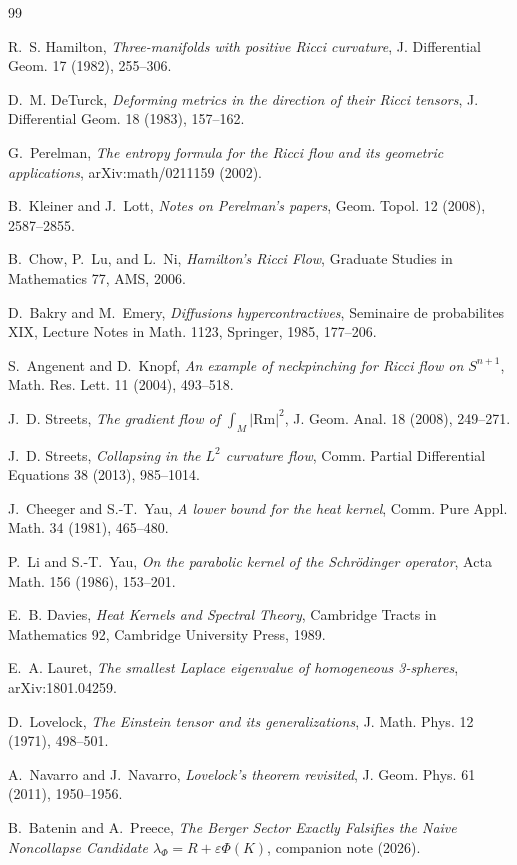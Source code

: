\documentclass[11pt]{amsart}
\newcommand{\Rm}{\mathrm{Rm}}
\begin{document}
\begin{thebibliography}{99}

R.~S. Hamilton,
\emph{Three-manifolds with positive Ricci curvature},
J. Differential Geom. 17 (1982), 255--306.

D.~M. DeTurck,
\emph{Deforming metrics in the direction of their Ricci tensors},
J. Differential Geom. 18 (1983), 157--162.

G.~Perelman,
\emph{The entropy formula for the Ricci flow and its geometric applications},
arXiv:math/0211159 (2002).

B.~Kleiner and J.~Lott,
\emph{Notes on Perelman's papers},
Geom. Topol. 12 (2008), 2587--2855.

B.~Chow, P.~Lu, and L.~Ni,
\emph{Hamilton's Ricci Flow},
Graduate Studies in Mathematics 77, AMS, 2006.

D.~Bakry and M.~Emery,
\emph{Diffusions hypercontractives},
Seminaire de probabilites XIX, Lecture Notes in Math. 1123, Springer, 1985, 177--206.

S.~Angenent and D.~Knopf,
\emph{An example of neckpinching for Ricci flow on \(S^{n+1}\)},
Math. Res. Lett. 11 (2004), 493--518.

J.~D. Streets,
\emph{The gradient flow of \(\int_M |\Rm|^2\)},
J. Geom. Anal. 18 (2008), 249--271.

J.~D. Streets,
\emph{Collapsing in the \(L^2\) curvature flow},
Comm. Partial Differential Equations 38 (2013), 985--1014.

J.~Cheeger and S.-T.~Yau,
\emph{A lower bound for the heat kernel},
Comm. Pure Appl. Math. 34 (1981), 465--480.

P.~Li and S.-T.~Yau,
\emph{On the parabolic kernel of the Schrödinger operator},
Acta Math. 156 (1986), 153--201.

E.~B. Davies,
\emph{Heat Kernels and Spectral Theory},
Cambridge Tracts in Mathematics 92, Cambridge University Press, 1989.

E.~A. Lauret,
\emph{The smallest Laplace eigenvalue of homogeneous 3-spheres},
arXiv:1801.04259.


D.~Lovelock,
\emph{The Einstein tensor and its generalizations},
J. Math. Phys. 12 (1971), 498--501.

A.~Navarro and J.~Navarro,
\emph{Lovelock's theorem revisited},
J. Geom. Phys. 61 (2011), 1950--1956.


B.~Batenin and A.~Preece,
\emph{The Berger Sector Exactly Falsifies the Naive Noncollapse Candidate
\(\lambda_\Phi=R+\varepsilon\Phi(K)\)},
companion note (2026).

\end{thebibliography}
\end{document}
